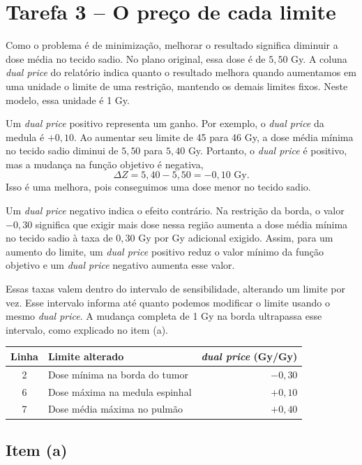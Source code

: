 \documentclass[12pt,a4paper]{article}
\begin{document}
\clearpage
\section*{Tarefa 3 -- O preço de cada limite}

Como o problema é de minimização, melhorar o resultado significa diminuir
a dose média no tecido sadio. No plano original, essa dose é de $5{,}50$ Gy.
A coluna \textit{dual price} do relatório indica quanto o resultado melhora
quando aumentamos em uma unidade o limite de uma restrição, mantendo os
demais limites fixos. Neste modelo, essa unidade é 1 Gy.

Um \textit{dual price} positivo representa um ganho. Por exemplo, o \textit{dual price} da
medula é $+0{,}10$. Ao aumentar seu limite de 45 para 46 Gy, a dose média
mínima no tecido sadio diminui de $5{,}50$ para $5{,}40$ Gy. Portanto,
o \textit{dual price} é positivo, mas a mudança na função objetivo é negativa,
\[
\Delta Z=5{,}40-5{,}50=-0{,}10\text{ Gy}.
\]
Isso é uma melhora, pois conseguimos uma dose menor no tecido sadio.

Um \textit{dual price} negativo indica o efeito contrário. Na restrição da borda,
o valor $-0{,}30$ significa que exigir mais dose nessa região aumenta a
dose média mínima no tecido sadio à taxa de $0{,}30$ Gy por Gy adicional
exigido. Assim, para um aumento do limite, um \textit{dual price} positivo reduz
o valor mínimo da função objetivo e um \textit{dual price} negativo aumenta esse valor.

Essas taxas valem dentro do intervalo de sensibilidade, alterando um
limite por vez. Esse intervalo informa até quanto podemos modificar
o limite usando o mesmo \textit{dual price}. A mudança completa de 1 Gy na borda
ultrapassa esse intervalo, como explicado no item (a).

\begin{center}
\begin{tabular}{clr}
\toprule
\textbf{Linha} & \textbf{Limite alterado} & \textbf{\textit{dual price} (Gy/Gy)} \\
\midrule
2 & Dose mínima na borda do tumor & $-0{,}30$ \\
6 & Dose máxima na medula espinhal & $+0{,}10$ \\
7 & Dose média máxima no pulmão & $+0{,}40$ \\
\bottomrule
\end{tabular}
\end{center}

\subsection*{Item (a)}
\end{document}
